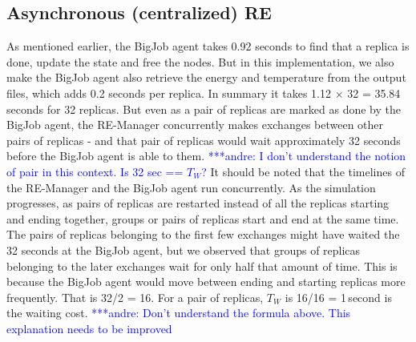\documentclass{rspublic}
\newcommand{\alnote}[1]{ {\textcolor{blue} { ***andre: #1 }}}
\newcommand{\alnote}[1]{}
\begin{document}
\subsection{Asynchronous (centralized) RE}



As mentioned earlier, the BigJob agent takes 0.92 seconds to find that
a replica is done, update the state and free the nodes. But in this
implementation, we also make the BigJob agent also retrieve the energy
and temperature from the output files, which adds 0.2 seconds per
replica. In summary it takes 1.12 $\times$ 32 = 35.84 seconds for 32
replicas. But even as a pair of replicas are marked as done by the
BigJob agent, the RE-Manager concurrently makes exchanges between
other pairs of replicas - and that pair of replicas would wait
approximately 32 seconds before the BigJob agent is able to
them. \alnote{I don't understand the notion of pair in this
  context. Is 32 sec == $T_W$?} It should be noted that the timelines
of the RE-Manager and the BigJob agent run concurrently.  As the
simulation progresses, as pairs of replicas are restarted instead of
all the replicas starting and ending together, groups or pairs of
replicas start and end at the same time. The pairs of replicas
belonging to the first few exchanges might have waited the 32 seconds
at the BigJob agent, but we observed that groups of replicas belonging
to the later exchanges wait for only half that amount of time. This is
because the BigJob agent would move between ending and starting
replicas more frequently. That is 32/2 = 16.  For a pair of replicas,
$T_W$ is 16/16 = 1\,second is the waiting cost.  \alnote{Don't
  understand the formula above. This explanation needs to be improved}
\end{document}
